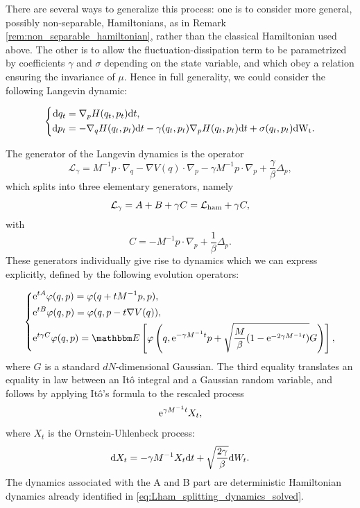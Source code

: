 \begin{remark}
    There are several ways to generalize this process: one is to consider more general, possibly non-separable, Hamiltonians, as in Remark \ref{rem:non_separable_hamiltonian}, rather than the classical Hamiltonian used above.
    The other is to allow the fluctuation-dissipation term to be parametrized by coefficients $\gamma$ and $\sigma$ depending on the state variable, and which obey a relation ensuring the invariance of $\mu$.
    Hence in full generality, we could consider the following Langevin dynamic:
    
    \begin{equation}
        \label{eq:general_langevin}
        \left\{\begin{aligned}
            \text dq_t &=\nabla_p H(q_t,p_t)\mathrm{d}t,\\
            \text dp_t &= -\nabla_q H(q_t,p_t)\mathrm{d}t -\gamma(q_t,p_t)\nabla_pH(q_t,p_t)\mathrm{d}t+\sigma(q_t,p_t)\rm{d}W_t.
        \end{aligned}\right.
    \end{equation}
\end{remark}
The generator of the Langevin dynamics is the operator
\begin{equation}
  \label{eq:langevin_generator}
\mathcal L_\gamma=M^{-1}p\cdot \nabla_q-\nabla V(q) \cdot \nabla_p- \gamma M^{-1} p \cdot \nabla_p+\frac\gamma\beta \Delta_p,
\end{equation}
which splits into three elementary generators, namely 
$$\mathcal L_\gamma= A+B+\gamma C=\mathcal{L}_{\rm ham} +\gamma C,$$
with
\begin{equation}
  \label{eq:C_definition}
C=-M^{-1}p\cdot \nabla_p +\frac1\beta \Delta_p.
\end{equation}
These generators individually give rise to dynamics which we can express explicitly, defined by the following evolution operators:

\begin{equation}
  \label{eq:propagators}
  \left\{\begin{aligned}
    &\mathrm{e}^{tA}\varphi(q,p)=\varphi(q+tM^{-1}p,p),\\
    &\mathrm{e}^{tB}\varphi(q,p)=\varphi(q,p-t\nabla V(q)),\\
   &\mathrm{e}^{t\gamma C}\varphi(q,p)=\mathbbm E \left[\varphi \left(q, \mathrm e^{-\gamma M^{-1}t}p + \sqrt{\frac{M}{\beta}(1-\mathrm{e}^{-2\gamma M^{-1}t})}G\right)\right],
\end{aligned}\right.
\end{equation}
where $G$ is a standard $dN$-dimensional Gaussian. The third equality translates an equality in law between an Itô integral and a Gaussian random variable, and follows by applying Itô's formula to the rescaled process
$$\mathrm{e}^{\gamma M^{-1}t}X_t,$$
where $X_t$ is the Ornstein-Uhlenbeck process:
\begin{equation}
    \mathrm{d} X_t=-\gamma M^{-1}X_t\mathrm{d} t+\sqrt{\frac{2\gamma}{\beta}}\mathrm{d} W_t.
\end{equation}
 The dynamics associated with the A and B part are deterministic Hamiltonian dynamics already identified in \eqref{eq:Lham_splitting_dynamics_solved}.

